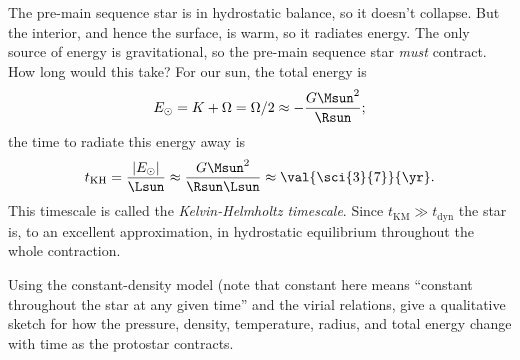 The pre-main sequence star is in hydrostatic balance, so it doesn't collapse. But the interior, and hence the surface, is warm, so it radiates energy.  The only source of energy is gravitational, so the pre-main sequence star \emph{must} contract.  How long would this take?  For our sun, the total energy is
\[
	E_{\odot} = K + \Omega = \Omega/2 \approx -\frac{G\Msun^{2}}{\Rsun};
\]
the time to radiate this energy away is
\begin{equation}\label{e.kelvin-helmholtz}
t_{\mathrm{KH}} = \frac{|E_{\odot}|}{\Lsun} \approx \frac{G\Msun^{2}}{\Rsun\Lsun} \approx \val{\sci{3}{7}}{\yr}.
\end{equation}
This timescale is called the \emph{Kelvin-Helmholtz timescale}.  Since $t_{\mathrm{KM}} \gg t_{\mathrm{dyn}}$ the star is, to an excellent approximation, in hydrostatic equilibrium throughout the whole contraction.
%

\begin{exercisebox}
Using the constant-density model (note that constant here means ``constant throughout the star at any given time'' and the virial relations, give a qualitative sketch for how the pressure, density, temperature, radius, and total energy change with time as the protostar contracts.
\end{exercisebox}
